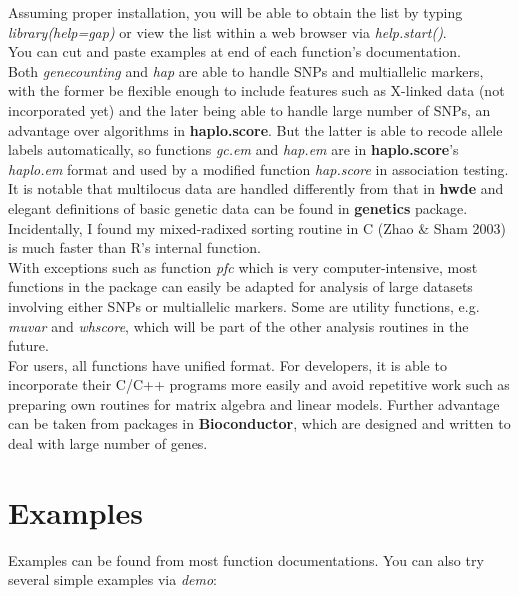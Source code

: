 \documentclass[10pt,a4paper]{article}
\begin{document}
Assuming proper installation, you will be able to obtain the list by typing
\textit{library(help=gap)} or view the list within a web browser via 
\textit{help.start()}.\\

You can cut and paste examples at end of each function's documentation.\\

Both \textit{genecounting} and \textit{hap} are able to handle SNPs and multiallelic
markers, with the former be flexible enough to include features such as X-linked data
(not incorporated yet) and the later being able to handle large number of SNPs, an
advantage over algorithms in {\bf haplo.score}. But the latter is able to recode
allele labels automatically, so functions \textit{gc.em} and \textit{hap.em}
are in {\bf haplo.score}'s \textit{haplo.em} format and used by a modified function
\textit{hap.score} in association testing.\\

It is notable that multilocus data are handled differently from that in {\bf hwde} and
elegant definitions of basic genetic data can be found in {\bf genetics} package.\\

Incidentally, I found my mixed-radixed sorting routine in C (Zhao \& Sham 2003) is much
faster than R's internal function.\\

With exceptions such as function \textit{pfc} which is very computer-intensive, most
functions in the package can easily be adapted for analysis of large datasets involving
either SNPs or multiallelic markers. Some are utility functions, e.g. \textit{muvar}
and \textit{whscore}, which will be part of the other analysis routines in the future.\\

For users, all functions have unified format. For developers, it is able to incorporate
their C/C++ programs more easily and avoid repetitive work such as preparing own routines
for matrix algebra and linear models. Further advantage can be taken from packages in
{\bf Bioconductor}, which are designed and written to deal with large number of genes.


\section{Examples}

Examples can be found from most function documentations. You can also try several simple
examples via \textit{demo}:
\end{document}
